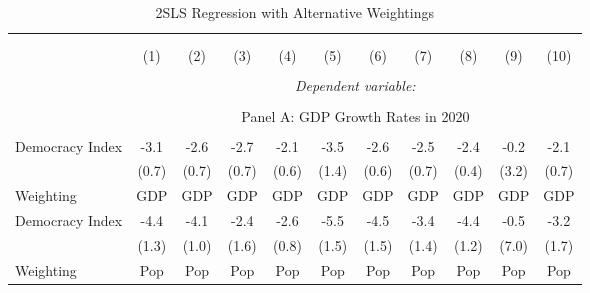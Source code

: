 \begin{landscape}
\begin{table}[!htbp] \centering 
  \caption{2SLS Regression with Alternative Weightings} 
  \label{tab:2sls-compare-weighting} 
  \begin{threeparttable}
\begin{tabular}{@{\extracolsep{0pt}}lcccccccccc} 
\\[-1.8ex]\hline 
\hline \\[-1.8ex] 

\\[-1.8ex] & (1) & (2) & (3) & (4) & (5) & (6) & (7) & (8) & (9) & (10)\\ 
\hline \\[-1.8ex] 
 & \multicolumn{10}{c}{\textit{Dependent variable:}} \\ 
\cline{2-11} 
\\[-1.8ex] & \multicolumn{10}{c}{Panel A: GDP Growth Rates in 2020} \\  \\
Democracy Index     &        -3.1\sym{***}&        -2.6\sym{***}&        -2.7\sym{***}&        -2.1\sym{***}&        -3.5\sym{*}  &        -2.6\sym{***}&        -2.5\sym{***}&        -2.4\sym{***}&        -0.2         &        -2.1\sym{**} \\
                    &       (0.7)         &       (0.7)         &       (0.7)         &       (0.6)         &       (1.4)         &       (0.6)         &       (0.7)         &       (0.4)         &       (3.2)         &       (0.7)         \\
 Weighting & GDP & GDP & GDP & GDP & GDP & GDP & GDP & GDP & GDP & GDP \\ 
 
Democracy Index     &        -4.4\sym{***}&        -4.1\sym{***}&        -2.4         &        -2.6\sym{***}&        -5.5\sym{***}&        -4.5\sym{**} &        -3.4\sym{*}  &        -4.4\sym{***}&        -0.5         &        -3.2         \\
                    &       (1.3)         &       (1.0)         &       (1.6)         &       (0.8)         &       (1.5)         &       (1.5)         &       (1.4)         &       (1.2)         &       (7.0)         &       (1.7)         \\

 Weighting & Pop & Pop & Pop & Pop & Pop & Pop & Pop & Pop & Pop & Pop  \\%


\end{tabular}
\end{threeparttable}
\end{table}
\end{landscape}
